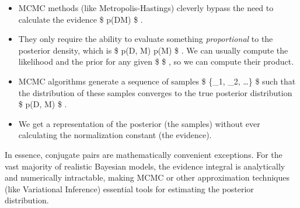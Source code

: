\documentclass[11pt]{article}
\providecommand{\tightlist}{%
      \setlength{\itemsep}{0pt}\setlength{\parskip}{0pt}}
\begin{document}
\begin{enumerate}
  \begin{itemize}
  \tightlist
  \item
    MCMC methods (like Metropolis-Hastings) cleverly bypass the need to
    calculate the evidence \$ p(D\textbar M) \$ .
  \item
    They only require the ability to evaluate something
    \emph{proportional} to the posterior density, which is \$
    p(D\textbar{}\theta, M) p(\theta\textbar M) \$ . We can usually
    compute the likelihood and the prior for any given \$ \theta \$ , so
    we can compute their product.
  \item
    MCMC algorithms generate a sequence of samples \$ \{\theta\_1,
    \theta\_2, \ldots\} \$ such that the distribution of these samples
    converges to the true posterior distribution \$ p(\theta\textbar D,
    M) \$ .
  \item
    We get a representation of the posterior (the samples) without ever
    calculating the normalization constant (the evidence).
  \end{itemize}
\end{enumerate}

In essence, conjugate pairs are mathematically convenient exceptions.
For the vast majority of realistic Bayesian models, the evidence
integral is analytically and numerically intractable, making MCMC or
other approximation techniques (like Variational Inference) essential
tools for estimating the posterior distribution.


    
    
    
\end{document}
